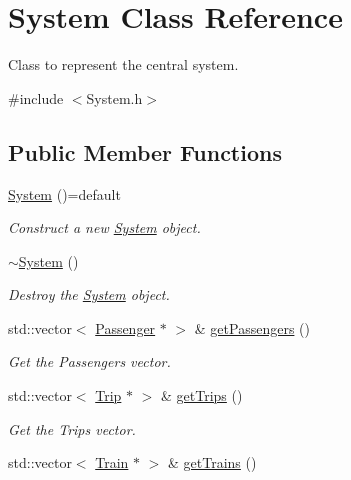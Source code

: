 \hypertarget{classSystem}{}\section{System Class Reference}
\label{classSystem}


Class to represent the central system.  




{\ttfamily \#include $<$System.\+h$>$}

\subsection*{Public Member Functions}
\begin{DoxyCompactItemize}
\item 
\mbox{\label{classSystem_a7ffb94a5a2db03014de0a8440f0cee3a}} 
\mbox{\hyperlink{classSystem_a7ffb94a5a2db03014de0a8440f0cee3a}{System}} ()=default
\begin{DoxyCompactList}\small\item\em Construct a new \mbox{\hyperlink{classSystem}{System}} object. \end{DoxyCompactList}\item 
\mbox{\hyperlink{classSystem_a3be70bb338e3f062f821173fd15680d0}{$\sim$\+System}} ()
\begin{DoxyCompactList}\small\item\em Destroy the \mbox{\hyperlink{classSystem}{System}} object. \end{DoxyCompactList}\item 
std\+::vector$<$ \mbox{\hyperlink{classPassenger}{Passenger}} $\ast$ $>$ \& \mbox{\hyperlink{classSystem_aa4879a70a434d3b879090500b282de0b}{get\+Passengers}} ()
\begin{DoxyCompactList}\small\item\em Get the Passengers vector. \end{DoxyCompactList}\item 
std\+::vector$<$ \mbox{\hyperlink{classTrip}{Trip}} $\ast$ $>$ \& \mbox{\hyperlink{classSystem_a97b3ac8c8d84fecbdd2c49df5e4b51bf}{get\+Trips}} ()
\begin{DoxyCompactList}\small\item\em Get the Trips vector. \end{DoxyCompactList}\item 
std\+::vector$<$ \mbox{\hyperlink{classTrain}{Train}} $\ast$ $>$ \& \mbox{\hyperlink{classSystem_a44ee205bcb6c27bb1a7bc7fb545aef44}{get\+Trains}} ()

\end{DoxyCompactItemize}

